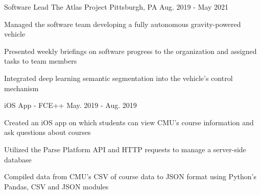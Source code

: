 

\begin{cventries}

  \cventry
    {Software Lead} %
    {The Atlas Project} %
    {Pittsburgh, PA} %
    {Aug. 2019 - May 2021} %
    {
      \begin{cvitems} %
		\item Managed the software team developing a fully autonomous gravity-powered vehicle
		\item Presented weekly briefings on software progress to the organization and assigned tasks to team members
		\item Integrated deep learning semantic segmentation into the vehicle's control mechanism
      \end{cvitems}
    }

  \cvproject
    {iOS App - FCE++} %
    {May. 2019 - Aug. 2019} %
    {
      \begin{cvitems} %
          \item Created an iOS app on which students can view CMU’s course information and ask questions about courses
          \item Utilized the Parse Platform API and HTTP requests to manage a server-side database
          \item Compiled data from CMU’s CSV of course data to JSON format using Python’s Pandas, CSV and JSON modules
      \end{cvitems}
    }

\end{cventries}
